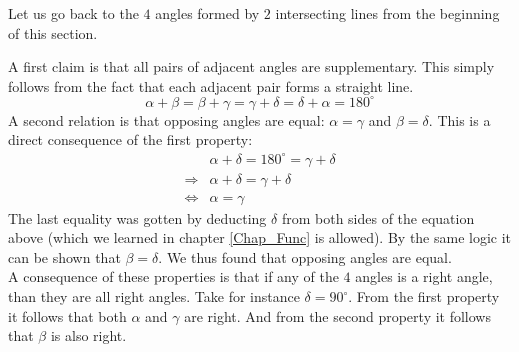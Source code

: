 \noindent Let us go back to the $4$ angles formed by $2$ intersecting lines from the beginning of this section.
\begin{center}
\end{center}
\noindent A first claim is that all pairs of adjacent angles are supplementary. This simply follows from the fact that each adjacent pair forms a straight line.
$$
\alpha + \beta = \beta + \gamma = \gamma + \delta = \delta + \alpha = 180^{\circ} 
$$
\noindent A second relation is that opposing angles are equal: $\alpha =\gamma$ and $\beta = \delta$. This is a direct consequence of the first property:
\begin{eqnarray*}
& \alpha + \delta  = 180^{\circ} = \gamma + \delta \\
\Rightarrow & \alpha + \delta = \gamma + \delta \\
\Leftrightarrow & \alpha = \gamma
\end{eqnarray*}
\noindent The last equality was gotten by deducting $\delta$ from both sides of the equation above (which we learned in chapter \ref{Chap_Func} is allowed). By the same logic it can be shown that $\beta = \delta$. We thus found that opposing angles are equal.\\

\noindent A consequence of these properties is that if any of the $4$ angles is a right angle, than they are all right angles. Take for instance $\delta = 90^{\circ}$. From the first property it follows that both $\alpha$ and $\gamma$ are right. And from the second property it follows that $\beta$ is also right.\\

